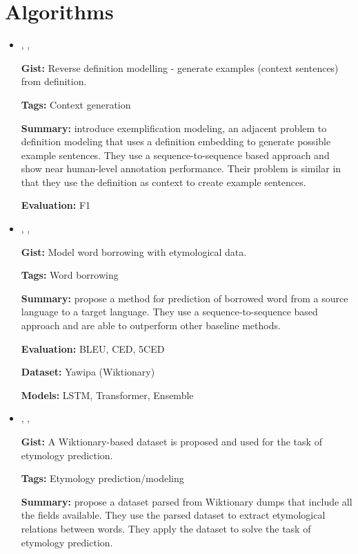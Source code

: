 \documentclass{article}[a4paper]
\newcommand{\bitem}[2]{
    \item[\cite{#1}]
        \textbf{\citetitle{#1}}, \citeauthor{#1}, \citeyear{#1}
        \newline\newline
        {#2}
}%
\begin{document}
\section{Algorithms}
\begin{itemize}
    \bitem{barba_exemplification_2021}%
    {%
        \textbf{Gist:}
        Reverse definition modelling - generate examples (context sentences)
        from definition.

        \textbf{Tags:}
        Context generation

        \textbf{Summary:}
        \citeauthor{barba_exemplification_2021} introduce exemplification
        modeling, an adjacent problem to definition modeling that uses a
        definition embedding to generate possible example sentences. They use a
        sequence-to-sequence based approach and show near human-level annotation
        performance. Their problem is similar in that they use the definition as
        context to create example sentences.

        \textbf{Evaluation:}
        F1
    }%

    \bitem{wu_2021_sequence}%
    {%
        \textbf{Gist:}
        Model word borrowing with etymological data.

        \textbf{Tags:}
        Word borrowing

        \textbf{Summary:}
        \citeauthor{wu_2021_sequence} propose a method for prediction of
        borrowed word from a source language to a target language. They use a
        sequence-to-sequence based approach and are able to outperform other
        baseline methods.

        \textbf{Evaluation:}
        BLEU, CED, 5CED

        \textbf{Dataset:}
        Yawipa (Wiktionary)

        \textbf{Models:}
        LSTM, Transformer, Ensemble
    }%

    \bitem{wu_computational_2020}%
    {%
        \textbf{Gist:}
        A Wiktionary-based dataset is proposed and used for the task of
        etymology prediction.

        \textbf{Tags:}
        Etymology prediction/modeling

        \textbf{Summary:}
        \citeauthor{wu_computational_2020} propose a dataset parsed from
        Wiktionary dumps that include all the fields available. They use the
        parsed dataset to extract etymological relations between words. They
        apply the dataset to solve the task of etymology prediction.

}
\end{itemize}
\end{document}
